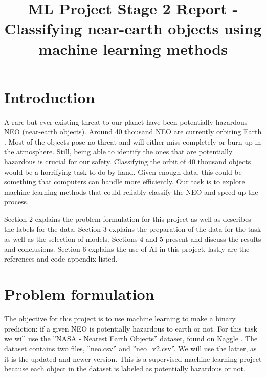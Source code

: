 \documentclass{article}
\title{ML Project Stage 2 Report - Classifying near-earth objects using machine learning methods}
\author{}
\date{}
\begin{document}
\maketitle


\vspace{-1.9cm}

\section{Introduction}

A rare but ever-existing threat to our planet have been potentially hazardous NEO (near-earth objects). Around 40 thousand NEO are currently orbiting Earth \cite{neo_stats}. Most of the objects pose no threat and will either miss completely or burn up in the atmosphere. Still, being able to identify the ones that are potentially hazardous is crucial for our safety. Classifying the orbit of 40 thousand objects would be a horrifying task to do by hand. Given enough data, this could be something that computers can handle more efficiently. Our task is to explore machine learning methods that could reliably classify the NEO and speed up the process.


\vspace{1em}

Section 2 explains the problem formulation for this project as well as describes the labels for the data. Section 3 explains the preparation of the data for the task as well as the selection of models. Sections 4 and 5 present and discuss the results and conclusions. Section 6 explains the use of AI in this project, lastly are the references and code appendix listed.

\section{Problem formulation}


The objective for this project is to use machine learning to make a binary prediction: if a given NEO is potentially hazardous to earth or not. For this task we will use the ''NASA - Nearest Earth Objects'' dataset, found on Kaggle \cite{Kaggle_neo_data}. The dataset contains two files, ''neo.csv'' and ''neo\_v2.csv''. We will use the latter, as it is the updated and newer version. This is a supervised machine learning project because each object in the dataset is labeled as potentially hazardous or not.

\vspace{1em}
\end{document}
